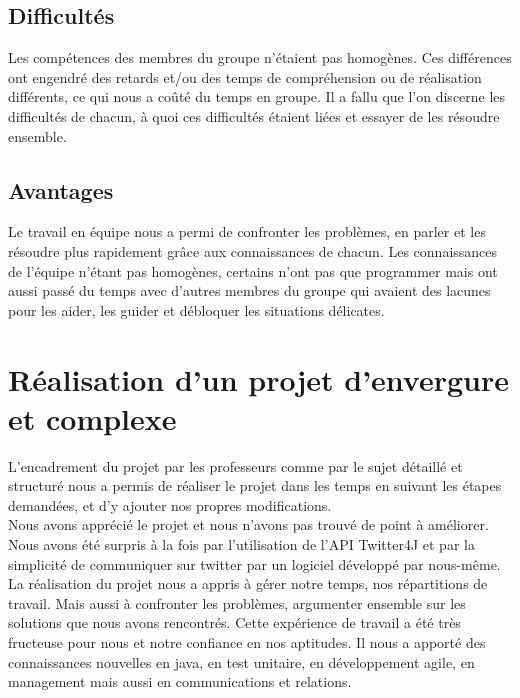 \documentclass[12pt]{article}
\begin{document}
\subsection{Difficultés}

Les compétences des membres du groupe n'étaient pas homogènes. Ces différences ont engendré des retards et/ou des temps de compréhension ou de réalisation différents, ce qui nous a coûté du temps en groupe. Il a fallu que l'on discerne les difficultés de chacun, à quoi ces difficultés étaient liées et essayer de les résoudre ensemble.

\subsection{Avantages}

Le travail en équipe nous a permi de confronter les problèmes, en parler et les résoudre plus rapidement grâce aux connaissances de chacun. Les connaissances de l'équipe n'étant pas homogènes, certains n'ont pas que programmer mais ont aussi passé du temps avec d'autres membres du groupe qui avaient des lacunes pour les aider, les guider et débloquer les situations délicates.

\newpage

\section{Réalisation d'un projet d'envergure et complexe}

L'encadrement du projet par les professeurs comme par le sujet détaillé et structuré nous a permis de réaliser le projet dans les temps en suivant les étapes demandées, et d'y ajouter nos propres modifications.\\

Nous avons apprécié le projet et nous n'avons pas trouvé de point à améliorer.\\

Nous avons été surpris à la fois par l'utilisation de l'API Twitter4J et par la simplicité de communiquer sur twitter par un logiciel développé par nous-même.\\

La réalisation du projet nous a appris à gérer notre temps, nos répartitions de travail. Mais aussi à confronter les problèmes, argumenter ensemble sur les solutions que nous avons rencontrés. Cette expérience de travail a été très fructeuse pour nous et notre confiance en nos aptitudes. Il nous a apporté des connaissances nouvelles en java, en test unitaire, en développement agile, en management mais aussi en communications et relations.
\end{document}
